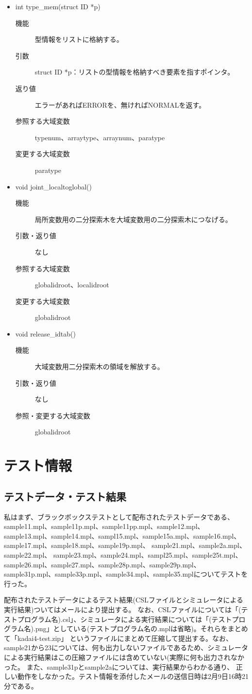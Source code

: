 \documentclass{jarticle}
\begin{document}
\begin{itemize}
\item int type\_mem(struct ID *p)
\begin{description}
\item[機能]型情報をリストに格納する。
\item[引数]struct ID *p：リストの型情報を格納すべき要素を指すポインタ。
\item[返り値]エラーがあればERRORを、無ければNORMALを返す。
\item[参照する大域変数]typenum、arraytype、arraynum、paratype
\item[変更する大域変数]paratype
\end{description}
\item void joint\_localtoglobal()
\begin{description}
\item[機能]局所変数用の二分探索木を大域変数用の二分探索木につなげる。
\item[引数・返り値]なし
\item[参照する大域変数]globalidroot、localidroot
\item[変更する大域変数]globalidroot
\end{description}
\item void release\_idtab()
\begin{description}
\item[機能]大域変数用二分探索木の領域を解放する。
\item[引数・返り値]なし
\item[参照・変更する大域変数]globalidroot
\end{description}
\end{itemize}
\section{テスト情報}
\subsection{テストデータ・テスト結果}
私はまず、ブラックボックステストとして配布されたテストデータである、sample11.mpl、sample11p.mpl、sample11pp.mpl、sample12.mpl、
sample13.mpl、sample14.mpl、sampl15.mpl、sample15a.mpl、sample16.mpl、sample17.mpl、sample18.mpl、sample19p.mpl、
sample21.mpl、sample2a.mpl、sample22.mpl、
sample23.mpl、sample24.mpl、sampl25.mpl、sample25t.mpl、sample26.mpl、sample27.mpl、sample28p.mpl、sample29p.mpl、sample31p.mpl、sample33p.mpl、sample34.mpl、sample35.mplについてテストを行った。

配布されたテストデータによるテスト結果(CSLファイルとシミュレータによる実行結果)ついてはメールにより提出する。
なお、CSLファイルについては「(テストプログラム名).csl」、シミュレータによる実行結果については「(テストプログラム名).png」としている(テストプログラム名の.mplは省略)。それらをまとめて「kadai4-test.zip」
というファイルにまとめて圧縮して提出する。なお、sample21から23については、何も出力しないファイルであるため、シミュレータによる実行結果はこの圧縮ファイルには含めていない(実際に何も出力されなかった。
また、sample31pとsample2aについては、実行結果からわかる通り、
正しい動作をしなかった。テスト情報を添付したメールの送信日時は2月9日16時21分である。
\end{document}
